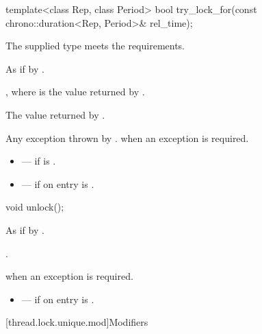%
\begin{itemdecl}
template<class Rep, class Period>
  bool try_lock_for(const chrono::duration<Rep, Period>& rel_time);
\end{itemdecl}

\begin{itemdescr}
\pnum
\expects
The supplied  type meets the  requirements.

\pnum
\effects
As if by .

\pnum
\ensures
{}, where  is the value returned by .

\pnum
\returns
The value returned by .

\pnum
\throws
Any exception thrown by .  when an
exception is required.

\pnum
\errors
\begin{itemize}
\item {} --- if  is .
\item {} --- if on entry  is
.
\end{itemize}
\end{itemdescr}

%
\begin{itemdecl}
void unlock();
\end{itemdecl}

\begin{itemdescr}
\pnum
\effects
As if by .

\pnum
\ensures
{}.

\pnum
\throws
{} when
an exception is required.

\pnum
\errors
\begin{itemize}
\item {} --- if on entry  is .
\end{itemize}
\end{itemdescr}

[thread.lock.unique.mod]{Modifiers}

